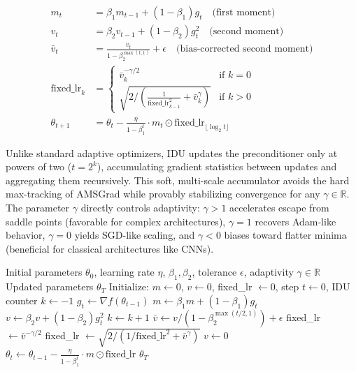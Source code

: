 \begin{align}
m_t &= \beta_1 m_{t-1} + (1-\beta_1) g_t \quad\text{(first moment)}\\
v_t &= \beta_2 v_{t-1} + (1-\beta_2) g_t^2 \quad\text{(second moment)}\\
\bar{v}_t &= \frac{v_t}{1-\beta_2^{\max(t,1)}} + \epsilon \quad\text{(bias-corrected second moment)}\\
\text{fixed\_lr}_k &= \begin{cases}
\bar{v}_k^{-\gamma/2} & \text{if } k = 0 \\
\sqrt{2 / \left(\frac{1}{\text{fixed\_lr}_{k-1}^2} + \bar{v}_k^\gamma\right)} & \text{if } k > 0
\end{cases}\\
\theta_{t+1} &= \theta_t - \frac{\eta}{1-\beta_1^t} \cdot m_t \odot \text{fixed\_lr}_{\lfloor\log_2 t\rfloor}
\end{align}

Unlike standard adaptive optimizers, IDU updates the preconditioner only at powers of two ($t = 2^k$), accumulating gradient statistics between updates and aggregating them recursively. This soft, multi-scale accumulator avoids the hard max-tracking of AMSGrad while provably stabilizing convergence for any $\gamma \in \mathbb{R}$. The parameter $\gamma$ directly controls adaptivity: $\gamma > 1$ accelerates escape from saddle points (favorable for complex architectures), $\gamma = 1$ recovers Adam-like behavior, $\gamma = 0$ yields SGD-like scaling, and $\gamma < 0$ biases toward flatter minima (beneficial for classical architectures like CNNs).

\begin{algorithm}[H]
\caption{Anon (Adaptivity Non-restricted Optimizer with IDU)}
\label{alg:anon}
\begin{algorithmic}[1]
\Require Initial parameters $\theta_0$, learning rate $\eta$, $\beta_1, \beta_2$, tolerance $\epsilon$, adaptivity $\gamma \in \mathbb{R}$
\Ensure Updated parameters $\theta_T$
\State Initialize: $m \gets 0$, $v \gets 0$, fixed\_lr $\gets 0$, step $t \gets 0$, IDU counter $k \gets -1$
    \State $g_t \gets \nabla f(\theta_{t-1})$
    \State $m \gets \beta_1 m + (1-\beta_1) g_t$
    \State $v \gets \beta_2 v + (1-\beta_2) g_t^2$
        \State $k \gets k+1$
        \State $\bar{v} \gets v/(1 - \beta_2^{\max(t/2,1)}) + \epsilon$
            \State fixed\_lr $\gets \bar{v}^{-\gamma/2}$
        \Else
            \State fixed\_lr $\gets \sqrt{2 / (1/\text{fixed\_lr}^2 + \bar{v}^\gamma)}$
        \EndIf
        \State $v \gets 0$
    \EndIf
    \State $\theta_t \gets \theta_{t-1} - \frac{\eta}{1-\beta_1^t} \cdot m \odot \text{fixed\_lr}$
\EndFor
\Return $\theta_T$
\end{algorithmic}
\end{algorithm}

